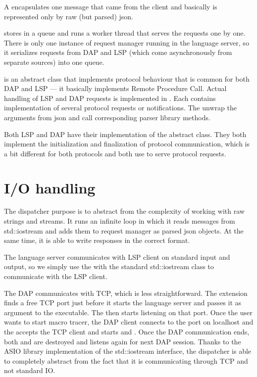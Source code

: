 A  encapsulates one message that came from the client and basically is represented only by raw (but parsed) json.

 stores  in a queue and runs a worker thread that serves the requests one by one. There is only one instance of request manager running in the language server, so it serializes requests from DAP and LSP (which come asynchronously from separate sources) into one queue.

 is an abstract class that implements protocol behaviour that is common for both DAP and LSP --- it basically implements Remote Procedure Call. Actual handling of LSP and DAP requests is implemented in . Each  contains implementation of several protocol requests or notifications. The  unwrap the arguments from json and call corresponding parser library methods.

Both LSP and DAP have their implementation of the abstract  class. They both implement the initialization and finalization of protocol communication, which is a bit different for both protocols and both use  to serve protocol requests.


\section{I/O handling}
The dispatcher purpose is to abstract from the complexity of working with raw strings and streams. It runs an infinite loop in which it reads messages from std::iostream and adds them to request manager as parsed json objects. At the same time, it is able to write responses in the correct format.

The language server communicates with LSP client on standard input and output, so we simply use the  with the standard std::iostream class to communicate with the LSP client.

The DAP communicates with TCP, which is less straightforward. The extension finds a free TCP port just before it starts the language server and passes it as argument to the executable. The  then starts listening on that port. Once the user wants to start macro tracer, the DAP client connects to the port on localhost and the  accepts the TCP client and starts  and . Once the DAP communication ends, both  and  are destroyed and  listens again for next DAP session. Thanks to the ASIO library implementation of the std::iostream interface, the dispatcher is able to completely abstract from the fact that it is communicating through TCP and not standard IO.

